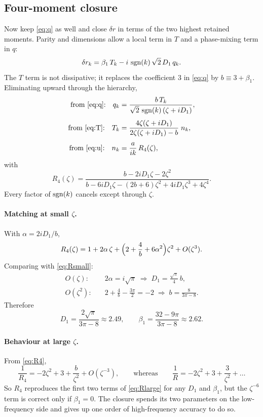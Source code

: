 \subsection{Four-moment closure}

Now keep \eqref{eq:q} as well and close $\delta r$ in terms of the two
highest retained moments. Parity and dimensions allow a local term in $T$
and a phase-mixing term in $q$:
\begin{equation}
  \delta r_k=\beta_1\,T_k-i\,\operatorname{sgn}(k)\,\sqrt2\,D_1\,q_k .
  \label{eq:closure4}
\end{equation}
The $T$ term is not dissipative; it replaces the coefficient $3$ in
\eqref{eq:q} by $b\equiv3+\beta_1$. Eliminating upward through the
hierarchy,
\begin{align*}
  \text{from \eqref{eq:q}:}\quad
    q_k&=\frac{b\,T_k}{\sqrt2\,\operatorname{sgn}(k)\,(\zeta+iD_1)},\\[4pt]
  \text{from \eqref{eq:T}:}\quad
    T_k&=\frac{4\zeta(\zeta+iD_1)}{2\zeta(\zeta+iD_1)-b}\;n_k,\\[4pt]
  \text{from \eqref{eq:u}:}\quad
    n_k&=\frac{a}{ik}\,R_4(\zeta),
\end{align*}
with
\begin{equation}
  R_4(\zeta)=\frac{b-2iD_1\zeta-2\zeta^2}
     {b-6iD_1\zeta-(2b+6)\zeta^2+4iD_1\zeta^3+4\zeta^4}.
  \label{eq:R4}
\end{equation}
Every factor of $\operatorname{sgn}(k)$ cancels except through $\zeta$.

\paragraph{Matching at small $\zeta$.} With $\alpha=2iD_1/b$,
\[
  R_4(\zeta)=1+2\alpha\,\zeta
    +\Bigl(2+\frac4b+6\alpha^2\Bigr)\zeta^2+O(\zeta^3).
\]
Comparing with \eqref{eq:Rsmall}:
\begin{align*}
  O(\zeta):&\quad2\alpha=i\sqrt\pi
    \;\Longrightarrow\;D_1=\frac{\sqrt\pi}{4}\,b,\\
  O(\zeta^2):&\quad2+\frac4b-\frac{3\pi}{2}=-2
    \;\Longrightarrow\;b=\frac{8}{3\pi-8}.
\end{align*}
Therefore
\begin{equation}
  D_1=\frac{2\sqrt\pi}{3\pi-8}\approx2.49,
  \qquad
  \beta_1=\frac{32-9\pi}{3\pi-8}\approx2.62 .
  \label{eq:coeffs4}
\end{equation}

\paragraph{Behaviour at large $\zeta$.} From \eqref{eq:R4},
\[
  \frac1{R_4}=-2\zeta^2+3+\frac{b}{\zeta^2}+O(\zeta^{-3}),
  \qquad\text{whereas}\qquad
  \frac1R=-2\zeta^2+3+\frac3{\zeta^2}+\dots
\]
So $R_4$ reproduces the first two terms of \eqref{eq:Rlarge} for any $D_1$
and $\beta_1$, but the $\zeta^{-6}$ term is correct only if $\beta_1=0$.
The closure spends its two parameters on the low-frequency side and gives
up one order of high-frequency accuracy to do so.

